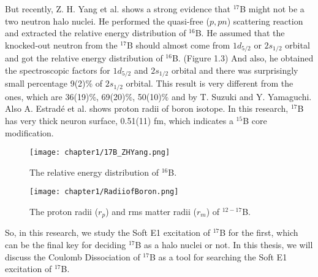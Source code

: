 But recently, Z. H. Yang et al. \cite{ZHYang} shows a strong evidence that ${}^{17}$B might not be a two neutron halo nuclei. He performed the quasi-free ($p,pn$) scattering reaction and extracted the relative energy distribution of ${}^{16}$B. He assumed that the knocked-out neutron from the ${}^{17}$B  should almost come from $1d_{5/2}$ or $2s_{1/2}$ orbital and got the relative energy distribution of ${}^{16}$B. (Figure 1.3) And also, he obtained the spectroscopic factors for $1d_{5/2}$ and $2s_{1/2}$ orbital and there was surprisingly small percentage 9(2)\% of $2s_{1/2}$ orbital. This result is very different from the ones, which are 36(19)\%, 69(20)\%, 50(10)\% and by T. Suzuki and Y. Yamaguchi. \cite{Suzuki99} \cite{Suzuki} \cite{Yamaguchi} Also A. Estradé et al. \cite{Estrade} shows proton radii of boron isotope. In this research, ${}^{17}$B has very thick neuron surface, 0.51(11) fm, which indicates a ${}^{15}$B core modification. 

\begin{figure}
    \centering
    \texttt{[image: chapter1/17B\_ZHYang.png]}
    \caption{The relative energy distribution of ${}^{16}$B.\cite{ZHYang}}
\end{figure}

\begin{figure}
    \centering
    \texttt{[image: chapter1/RadiiofBoron.png]}
    \caption{The proton radii ($r_p$) and rms matter radii ($r_m$) of ${}^{12-17}$B. \cite{Estrade}}
\end{figure}
So, in this research, we study the Soft E1 excitation of ${}^{17}$B for the first, which can be the final key for deciding ${}^{17}$B as a halo nuclei or not. In this thesis, we will discuss the Coulomb Dissociation of ${}^{17}$B as a tool for searching the Soft E1 excitation of ${}^{17}$B. 


